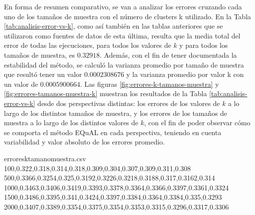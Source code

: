 \bigskip En forma de resumen comparativo, se van a analizar los errores cruzando cada uno de los tamaños de muestra con el número de clusters k utilizado. En la Tabla \ref{tab:analisis-error-vs-k}, como así también en las tablas anteriores que se utilizaron como fuentes de datos de esta última, resulta que la media total del error de todas las ejecuciones, para todos los valores de \(k\) y para todos los tamaños de muestra, es \(0.32918\). Además, con el fin de tener documentada la estabilidad del método, se calculó la varianza promedio por tamaño de muestra que resultó tener un valor \(0.0002308676\) y la varianza promedio por valor k con un valor de \(0.0005900664\). Las figuras \ref{fig:errores-k-tamanos-muestra} y \ref{fig:errores-tamanos-muestra-k} muestran los resultados de la Tabla \ref{tab:analisis-error-vs-k} desde dos perspectivas distintas: los errores de los valores de \(k\) a lo largo de los distintos tamaños de muestra, y los errores de los tamaños de muestra a lo largo de los distintos valores de \(k\), con el fin de poder observar cómo se comporta el método EQuAL en cada perspectiva, teniendo en cuenta variabilidad y valor absoluto de los errores promedio.

\begin{filecontents*}{erroresktamanomuestra.csv}
100,0.322,0.318,0.314,0.318,0.309,0.304,0.307,0.309,0.311,0.308
500,0.3366,0.3254,0.325,0.3192,0.3226,0.3218,0.3188,0.317,0.3162,0.314
1000,0.3463,0.3406,0.3419,0.3393,0.3378,0.3364,0.3366,0.3397,0.3361,0.3324
1500,0.3486,0.3395,0.341,0.3424,0.3397,0.3384,0.3364,0.3384,0.335,0.3293
2000,0.3407,0.3389,0.3354,0.3375,0.3354,0.3353,0.3315,0.3296,0.3317,0.3306
\end{filecontents*}

